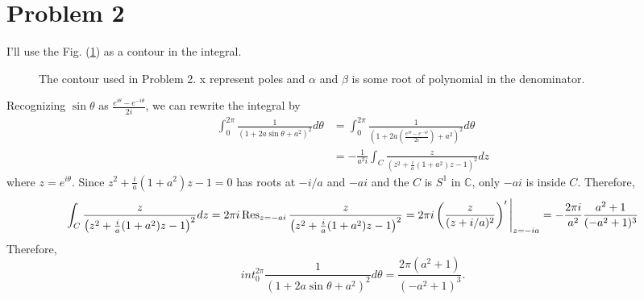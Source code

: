 \documentclass{article}
\begin{document}
\section*{Problem 2}
I'll use the Fig. (\ref{Fig:P2}) as a contour in the integral.

\begin{figure}[h]
\centering
{}
\caption{The contour used in Problem 2. x represent poles and $\alpha$ and $\beta$ is some root of polynomial in the denominator.}
\label{Fig:P2}
\end{figure}
Recognizing $\sin\theta$ as $\frac{e^{i\theta}-e^{-i\theta}}{2i}$, we can rewrite the integral by
\begin{equation*}
\begin{split}
\int_0^{2\pi} \frac{1}{(1+2a\sin\theta+a^2)^2}d\theta&=\int_0^{2\pi} \frac{1}{\left(1+2a\left(\frac{e^{i\theta}-e^{-i\theta}}{2i}\right)+a^2\right)^2}d\theta\\
&=-\frac{1}{a^2i}\int_{C} \frac{z}{\left(z^2+\frac{i}{a}(1+a^2)z-1\right)^2}dz
\end{split}
\end{equation*}
where $z=e^{i\theta}$. Since $z^2+\frac{i}{a}(1+a^2)z-1=0$ has roots at $-i/a$ and $-ai$ and the $C$ is $S^1$ in $\mathbb{C}$, only $-ai$ is inside $C$. Therefore, 
\begin{equation*}
\int_{C} \frac{z}{\left(z^2+\frac{i}{a}(1+a^2)z-1\right)^2}dz=2\pi i\Res_{z=-ai}\frac{z}{\left(z^2+\frac{i}{a}(1+a^2)z-1\right)^2}=2\pi i\left(\frac{z}{(z+i/a)^2}\right)'\Bigg{|}_{z=-ia}=-\frac{2\pi i}{a^2}\frac{a^2+1}{(-a^2+1)^3}
\end{equation*}
Therefore,
\begin{equation*}
int_0^{2\pi} \frac{1}{(1+2a\sin\theta+a^2)^2}d\theta=\frac{2\pi(a^2+1)}{(-a^2+1)^3}.
\end{equation*}
\end{document}
